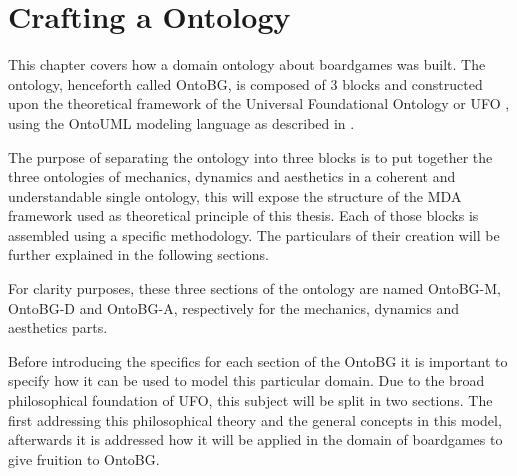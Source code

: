\chapter{Crafting a Ontology}

This chapter covers how a domain ontology about boardgames was built. The ontology, henceforth called OntoBG, is composed of 3 blocks and constructed upon the theoretical framework of the Universal Foundational Ontology or UFO \citep{guizzardi_ontological_2005}, using the OntoUML modeling language as described in \cite{guizzardi_ontological_2005,guizzardi_ontoUML_2004,guizzardi2015towards}. 

The purpose of separating the ontology into three blocks is to put together the three ontologies of mechanics, dynamics and aesthetics in a coherent and understandable single ontology, this will expose the structure of the MDA framework used as theoretical principle of this thesis. Each of those blocks is assembled using a specific methodology. The particulars of their creation will be further explained in the following sections.


For clarity purposes, these three sections of the ontology are named OntoBG-M, OntoBG-D and OntoBG-A, respectively for the mechanics, dynamics and aesthetics parts.


Before introducing the specifics for each section of the OntoBG it is important to specify how it can be used to model this particular domain. Due to the broad philosophical foundation of UFO, this subject will be split in two sections. The first addressing this philosophical theory and the general concepts in this model, afterwards it is addressed how it will be applied in the domain of boardgames to give fruition to OntoBG.












